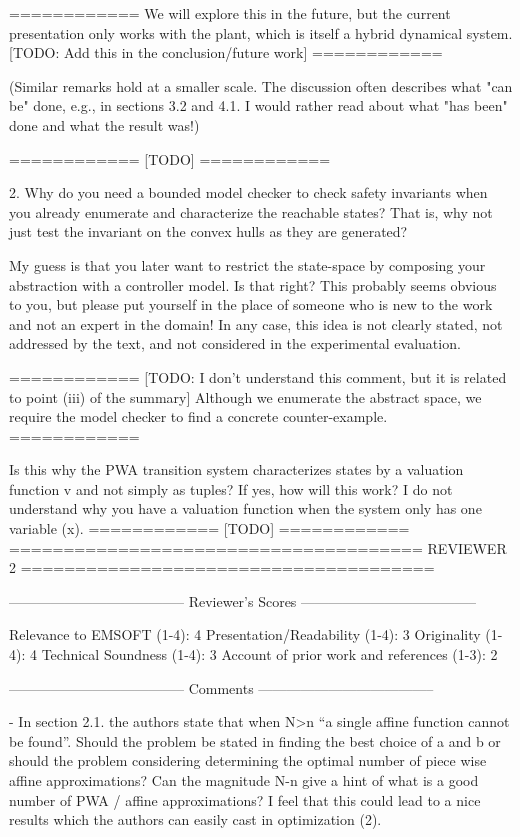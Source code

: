    ============
   We will explore this in the future, but the current presentation
   only works with the plant, which is itself a hybrid dynamical
   system.
   [TODO: Add this in the conclusion/future work]
   ============


   (Similar remarks hold at a smaller scale. The discussion often describes
    what "can be" done, e.g., in sections 3.2 and 4.1. I would rather read
    about what "has been" done and what the result was!)

   ============
   [TODO]
   ============

2. Why do you need a bounded model checker to check safety invariants when
   you already enumerate and characterize the reachable states? That is, why
   not just test the invariant on the convex hulls as they are generated?

   My guess is that you later want to restrict the state-space by composing
   your abstraction with a controller model. Is that right? This probably
   seems obvious to you, but please put yourself in the place of someone who
   is new to the work and not an expert in the domain! In any case, this
   idea is not clearly stated, not addressed by the text, and not considered
   in the experimental evaluation.

   ============
   [TODO: I don't understand this comment, but it is related to
   point (iii) of the summary]
   Although we enumerate the abstract space, we require the model
   checker to find a concrete counter-example.
   ============

   Is this why the PWA transition system characterizes states by a valuation
   function v and not simply as tuples? If yes, how will this work? I do not
   understand why you have a valuation function when the system only has one
   variable (x).
   ============
   [TODO]
   ============
======================================
                            REVIEWER 2
======================================


--------------------------------------
Reviewer's Scores
--------------------------------------

               Relevance to EMSOFT (1-4): 4
          Presentation/Readability (1-4): 3
                       Originality (1-4): 4
               Technical Soundness (1-4): 3
Account of prior work and references (1-3): 2


--------------------------------------
Comments
--------------------------------------

- In section 2.1. the authors state that when N>n “a single affine function
cannot be found”. Should the problem be stated in finding the best choice of
a and b or should the problem considering determining the optimal number of
piece wise affine approximations? Can the magnitude N-n give a hint of what is
a good number of PWA / affine approximations? I feel that this could lead to a
nice results which the authors can easily cast in optimization (2).

